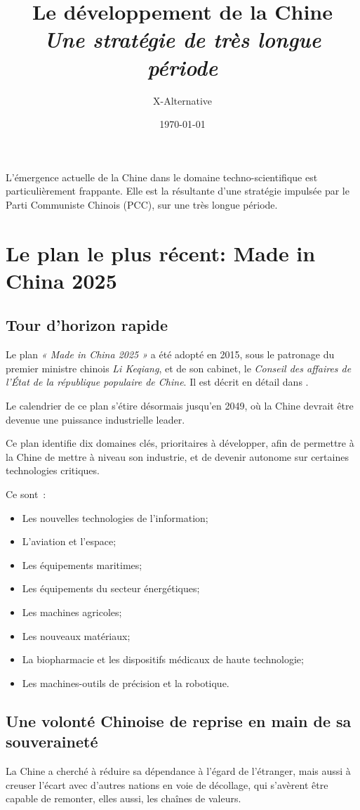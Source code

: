 \documentclass[a4paper]{article}
\author{X-Alternative}
\date{\today}
\title{Le développement de la Chine\\ 
 \large \textit{Une stratégie de très longue période}
 }
\begin{document}
\maketitle 

\newpage
\tableofcontents
\newpage

L’émergence actuelle de la Chine dans le domaine techno-scientifique est particulièrement frappante. Elle est la résultante d’une stratégie impulsée par le Parti Communiste Chinois (PCC), sur une très longue période.

\section{Le plan le plus récent: Made in China 2025}
\label{sec:org5915e2c}
\subsection{Tour d’horizon rapide}
\label{sec:org35ecd62}
Le plan \textit{« Made in China 2025 »} a été adopté en 2015, sous le patronage du premier ministre chinois \textit{Li Keqiang}, et de son cabinet, le \textit{Conseil des affaires de l'État de la république populaire de Chine}. Il est décrit en détail dans \cite{Made_In_China_2025}. 

Le calendrier de ce plan s’étire désormais jusqu’en 2049, où la Chine devrait être devenue une puissance industrielle leader. \cite{Evolving_MiC25} 

Ce plan identifie dix domaines clés, prioritaires à développer, afin de permettre à la Chine de mettre à niveau son industrie, et de devenir autonome sur certaines technologies critiques.

Ce sont~:
\begin{itemize}
\item Les nouvelles technologies de l’information;
\item L’aviation et l’espace;
\item Les équipements maritimes;
\item Les équipements du secteur énergétiques;
\item Les machines agricoles;
\item Les nouveaux matériaux;
\item La biopharmacie et les dispositifs médicaux de haute technologie;
\item Les machines-outils de précision et la robotique.
\end{itemize}

\subsection{Une volonté Chinoise de reprise en main de sa souveraineté}
\label{sec:orgf222c4b}
La Chine a cherché à réduire sa dépendance à l’égard de l’étranger, mais aussi à creuser l’écart avec d’autres nations en voie de décollage, qui s’avèrent être capable de remonter, elles aussi, les chaînes de valeurs. 
\end{document}
